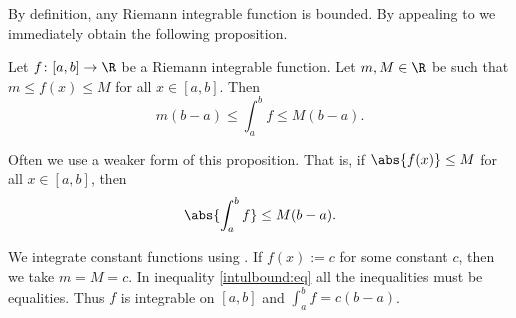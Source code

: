 \documentclass[12pt]{book}
\begin{document}
By definition, any Riemann integrable function is bounded.
By appealing to  we immediately obtain
the following proposition.

\begin{prop} \label{intbound:prop}
Let $f \colon [a,b] \to \R$ be a Riemann integrable function.
Let $m, M \in \R$ be 
such that $m \leq f(x) \leq M$ for all $x \in [a,b]$.
Then
\begin{equation*}
m(b-a) \leq
\int_a^b f
\leq M(b-a) .
\end{equation*}
\end{prop}

Often we use a weaker form of this proposition.
That is, if
$\abs{f(x)} \leq M$ for all $x \in [a,b]$, then
\begin{equation*}
\abs{\int_a^b f} \leq M(b-a) .
\end{equation*}

\begin{example}
We integrate constant functions using
.
If $f(x) := c$ for some constant $c$, then we take $m = M = c$.
In inequality \eqref{intulbound:eq}
all the inequalities must be equalities.
Thus $f$ is integrable on $[a,b]$ and $\int_a^b f = c(b-a)$.
\end{example}
\end{document}
